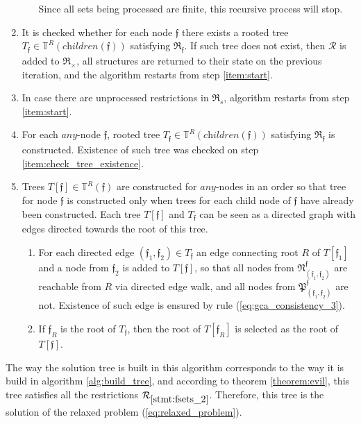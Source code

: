 \documentclass[times, 10pt,twocolumn]{article}
\newcommand{\gR}{\mathfrak{R}}
\newcommand{\gN}{\mathfrak{N}}
\newcommand{\gP}{\mathfrak{P}}
\newcommand{\gf}{\mathfrak{f}}
\newcommand{\cR}{\mathcal{R}}
\newcommand{\nT}{\mathbb{T}}
\newcommand{\any}{\textit{any}}
\newcommand{\children}{\textit{children}}
\begin{document}
\begin{enumerate}
\begin{enumerate}
          Since all sets being processed are finite,
          this recursive process will stop.
          \label{item:consistency_end}
    \end{enumerate}
\item It is checked whether for each node $\gf$ there exists
 a rooted tree $T_{\gf} \in \nT^R(\children(\gf))$ satisfying $\gR_{\gf}$.
 If such tree does not exist, then $\cR$ is added to $\gR_{\times}$,
 all structures are returned to their state on the previous iteration,
 and the algorithm restarts from step \ref{item:start}.
 \label{item:check_tree_existence}
\item In case there are unprocessed restrictions in $\gR_s$,
 algorithm restarts from step \ref{item:start}.
\item For each $\any$-node $\gf$,
 rooted tree $T_{\gf} \in \nT^R(\children(\gf))$ satisfying $\gR_{\gf}$
 is constructed.
 Existence of such tree was checked on step
 \ref{item:check_tree_existence}.
\item Trees $T[\gf] \in \nT^R(\gf)$ are constructed for $\any$-nodes
 in an order so that tree for node $\gf$ is constructed
 only when trees for each child node of $\gf$ have already been constructed.
 Each tree $T[\gf]$ and $T_{\gf}$ can be seen as a directed graph
 with edges directed towards the root of this tree.
 \label{item:build_sol}
    \begin{enumerate}
    \item For each directed edge $(\gf_1, \gf_2) \in T_{\gf}$
          an edge connecting root $R$ of $T[\gf_1]$ and a node from $\gf_2$
          is added to $T[\gf]$,
          so that all nodes from $\gN^{\gf}_{(\gf_1, \gf_2)}$ are reachable
          from $R$ via directed edge walk,
          and all nodes from $\gP^{\gf}_{(\gf_1, \gf_2)}$ are not.
          Existence of such edge is ensured by
          rule (\ref{eq:gca_consistency_3}).
    \item If $\gf_R$ is the root of $T_{\gf}$,
          then the root of $T[\gf_R]$ is selected as the root of $T[\gf]$.
    \end{enumerate}
\end{enumerate}

The way the solution tree is built in this algorithm
corresponds to the way it is build in algorithm \ref{alg:build_tree},
and according to theorem \ref{theorem:evil},
this tree satisfies all the restrictions $\cR_{\ref{stmt:fsets_2}}$. Therefore, this tree is the solution of the relaxed problem (\ref{eq:relaxed_problem}).
\end{document}
